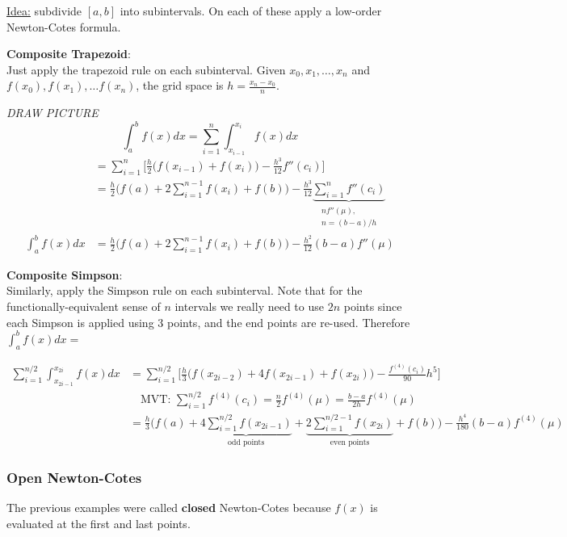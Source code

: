 \documentclass[12pt]{exam}
\begin{document}
\underline{Idea:} subdivide $[a,b]$ into subintervals. On each of these apply a low-order Newton-Cotes formula.

\textbf{Composite Trapezoid}:\\
Just apply the trapezoid rule on each subinterval. Given $x_0, x_1, \dots, x_n$ and $f(x_0), f(x_1), \dots f(x_n)$, the grid space is $h = \frac{x_n-x_0}{n}$.

\textit{DRAW PICTURE}
\vspace*{-1em}
\[
\int_{a}^{b} f(x)dx = \sum_{i=1}^n \int_{x_{i-1}}^{x_i} f(x)dx\]
\ifprintanswers
\begin{align*}
&= \sum_{i=1}^n \bigl[ \frac{h}{2}\bigl(f(x_{i-1}) + f(x_i)\bigr) - \frac{h^3}{12}f''(c_i) \bigr] \\
&= \frac{h}{2}\bigl(f(a) + 2\sum_{i=1}^{n-1}f(x_i) + f(b)\bigr) - \frac{h^3}{12} \underbrace{\sum_{i=1}^n f''(c_i)}_{\substack{n f''(\mu),\\ n = (b-a)/h}}\\
\int_{a}^{b} f(x)dx &= \boxed{\frac{h}{2}\bigl(f(a) + 2\sum_{i=1}^{n-1}f(x_i) + f(b)\bigr) - \frac{h^2}{12}(b-a)f''(\mu) }
\end{align*}
\else
\vspace*{9em}
\fi
 
\textbf{Composite Simpson}:\\
Similarly, apply the Simpson rule on each subinterval. Note that for the functionally-equivalent sense of $n$ intervals we really need to use $2n$ points since each Simpson is applied using 3 points, and the end points are re-used. Therefore $\int_{a}^{b} f(x)dx = $

\begin{align*}
\sum_{i=1}^{n/2}\int_{x_{2i-1}}^{x_{2i}} f(x)dx &= \sum_{i=1}^{n/2} \bigl[ \frac{h}{3}\bigl(f(x_{2i-2}) + 4f(x_{2i-1}) + f(x_{2i})\bigr) - \frac{f^{(4)}(c_i)}{90}h^5 \bigr]\\
&\quad \text{MVT: } \sum_{i=1}^{n/2}f^{(4)}(c_i) = \frac{n}{2}f^{(4)}(\mu) = \frac{b-a}{2h}f^{(4)}(\mu)\\
&= \frac{h}{3}\bigl(f(a) + \underbrace{4\sum_{i=1}^{n/2} f(x_{2i-1})}_{\text{odd points}} + \underbrace{2\sum_{i=1}^{n/2-1} f(x_{2i})}_{\text{even points}} + f(b)\bigr) - \frac{h^4}{180}(b-a)f^{(4)}(\mu)
\end{align*}


\subsubsection*{Open Newton-Cotes}
The previous examples were called \textbf{closed} Newton-Cotes because $f(x)$ is evaluated at the first and last points.
\end{document}
